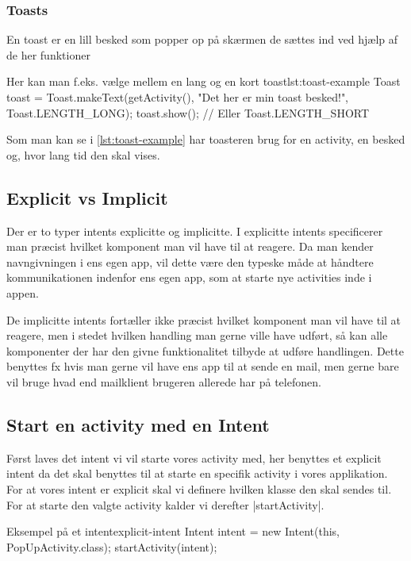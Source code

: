\subsubsection{Toasts}

En toast er en lill besked som popper op på skærmen de sættes ind ved hjælp af de her funktioner  

\begin{JavaCode}{Her kan man f.eks. vælge mellem en lang og en kort toast}{lst:toast-example}
	Toast toast = Toast.makeText(getActivity(), 
								"Det her er min toast besked!",
								Toast.LENGTH_LONG);
	toast.show();
	// Eller Toast.LENGTH_SHORT
\end{JavaCode}

Som man kan se i \autoref{lst:toast-example} har toasteren brug for en activity, en besked og, hvor lang tid den skal vises.

\subsection{Explicit vs Implicit}

Der er to typer intents explicitte og implicitte. I explicitte intents specificerer man præcist hvilket komponent man vil have til at reagere. Da man kender navngivningen i ens egen app, vil dette være den typeske måde at håndtere kommunikationen indenfor ens egen app, som at starte nye activities inde i appen.

De implicitte intents fortæller ikke præcist hvilket komponent man vil have til at reagere, men i stedet hvilken handling man gerne ville have udført, så kan alle komponenter der har den givne funktionalitet tilbyde at udføre handlingen. Dette benyttes fx hvis man gerne vil have ens app til at sende en mail, men gerne bare vil bruge hvad end mailklient brugeren allerede har på telefonen.

\subsection{Start en activity med en Intent}

Først laves det intent vi vil starte vores activity med, her benyttes et explicit intent da det skal benyttes til at starte en specifik activity i vores applikation. For at vores intent er explicit skal vi definere hvilken klasse den skal sendes til. For at starte den valgte activity kalder vi derefter \JavaInline|startActivity|.

\begin{JavaCode}{Eksempel på et intent}{explicit-intent}
	Intent intent = new Intent(this, PopUpActivity.class);
	startActivity(intent);
\end{JavaCode}

